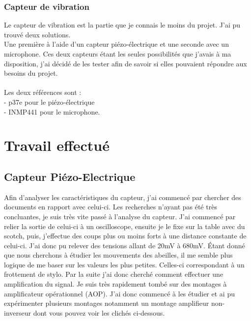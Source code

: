 \documentclass[12pt]{article}
\begin{document}
\subsubsection{Capteur de vibration}
Le capteur de vibration est la partie que je connais le moins du projet. J'ai pu trouvé deux solutions.\\
 Une première à l'aide d'un capteur piézo-électrique et une seconde avec un  microphone. Ces deux capteurs étant les seules possibilités que j'avais à ma disposition, 
 j'ai décidé de les tester afin de savoir si elles pouvaient répondre aux besoins du projet.\\
\\
 Les deux références sont :\\
- p37e pour le piézo-électrique\\
- INMP441 pour le microphone.\\

\section{Travail effectué}
\subsection{Capteur Piézo-Electrique}

Afin d'analyser les caractéristiques du capteur, j'ai commencé par chercher des documents en rapport avec celui-ci. Les recherches n'ayant pas 
été très concluantes, je suis très vite passé à l'analyse du capteur. J'ai commencé par relier la sortie de celui-ci à un oscilloscope, ensuite je le fixe
sur la table avec du scotch, puis, j'effectue des coups plus ou moins forts à une distance constante de celui-ci. J'ai donc pu relever des tensions allant de 20mV à 680mV.
Étant donné que nous cherchons à étudier les mouvements des abeilles, il me semble plus logique de me baser sur les valeurs les plus petites. Celles-ci correspondant à un frottement de stylo.
Par la suite j'ai donc cherché comment effectuer une amplification du signal. Je suis très rapidement tombé sur des montages à amplificateur opérationnel (AOP). J'ai donc commencé
à les étudier et ai pu expérimenter plusieurs montages notamment un montage amplifieur non-inverseur dont vous pouvez voir les clichés ci-dessous.
\end{document}
